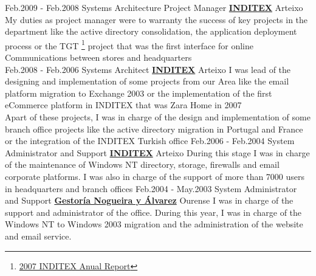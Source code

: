\documentclass[a4paper]{twentysecondcv} %
\begin{document}
\begin{twenty}  
\twentyitem
    	{Feb.2009 -}
		{Feb.2008}
        {Systems Architecture Project Manager}
        {\href{https://www.inditex.com/}{\textbf{INDITEX}}}
        {Arteixo}
        {
        My duties as project manager were to warranty the success of key projects in the department like the active directory consolidation, the application deployment process or the TGT \footnote{\href {https://www.inditex.com/documents/10279/245898/Memoria_Anual_2007.pdf/74c34dcb-6502-4078-a13c-a4d50c55676b}{2007 INDITEX Anual Report}} project that was the first interface for online Communications between stores and headquarters 
        }
        \\
\twentyitem
    	{Feb.2008 -}
		{Feb.2006}
        {Systems Architect}
        {\href{https://www.inditex.com/}{\textbf{INDITEX}}}
        {Arteixo}
        {
        I was lead of the designing and implementation of some projects from our Area like the email platform migration to Exchange 2003 or the implementation of the first eCommerce platform in INDITEX that was Zara Home in 2007\\
        Apart of these projects, I was in charge of the design and implementation of some branch office projects like the active directory migration in Portugal and France or the integration of the INDITEX Turkish office
        }
\twentyitem
    	{Feb.2006 -}
		{Feb.2004}
        {System Administrator and Support}
        {\href{https://www.inditex.com/}{\textbf{INDITEX}}}
        {Arteixo}
        {
        During this stage I was in charge of the maintenance of Windows NT directory, storage, firewalls and email corporate platforms.\newline{}
        I was also in charge of the support of more than 7000 users in headquarters and branch offices
        }
\twentyitem
    	{Feb.2004 -}
		{May.2003}
        {System Administrator and Support}
        {\href{http://www.nogueirayalvarez.es/}{\textbf{Gestor\'ia Nogueira y \'Alvarez}}}
        {Ourense}
        {
        I was in charge of the support and administrator of the office. During this year, I was in charge of the Windows NT to Windows 2003 migration and the administration of the website and email service.
        }
\end{twenty}

\end{document}

